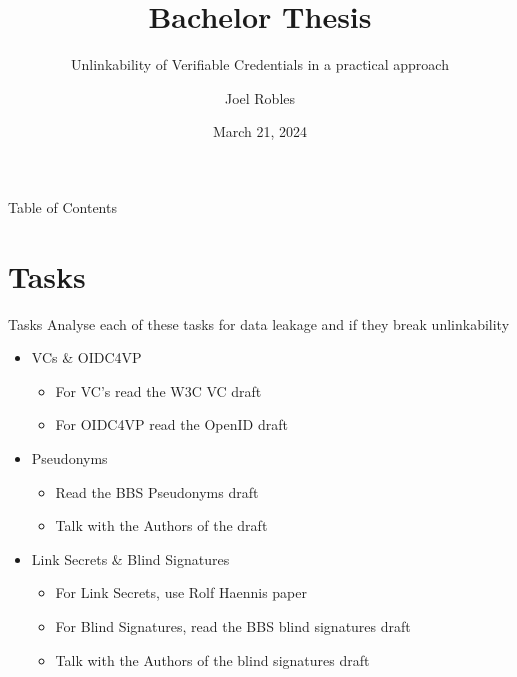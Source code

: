 \documentclass[
	english,%
	authorontitle=true,
	]{bfhbeamer}
\title{Bachelor Thesis}
\subtitle{Unlinkability of Verifiable Credentials in a practical approach}
\author[J. Robles]{Joel Robles}
\institute{TI}
\date{March 21, 2024}
\begin{document}
\maketitle

\begin{frame}{Table of Contents}
    \tableofcontents
\end{frame}

\section{Tasks}

\begin{frame}{Tasks}
    Analyse each of these tasks for data leakage and if they break unlinkability
    \begin{itemize}
        \item VCs \& OIDC4VP
        \begin{itemize}
            \item For VC's read the W3C VC draft
            \item For OIDC4VP read the OpenID draft
        \end{itemize}
        \item Pseudonyms
        \begin{itemize}
            \item Read the BBS Pseudonyms draft
            \item Talk with the Authors of the draft
        \end{itemize}
        \item Link Secrets \& Blind Signatures
        \begin{itemize}
            \item For Link Secrets, use Rolf Haennis paper
            \item For Blind Signatures, read the BBS blind signatures draft
            \item Talk with the Authors of the blind signatures draft
        \end{itemize}
    \end{itemize}
\end{frame}
\end{document}
